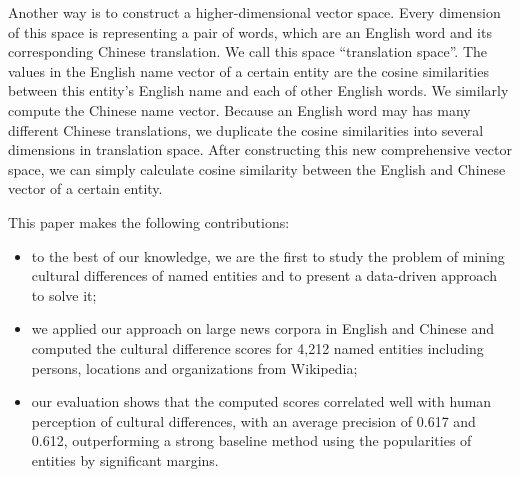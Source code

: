 Another way is to construct a higher-dimensional vector space.
Every dimension of this space is representing a pair of words,
which are an English word and its corresponding Chinese translation.
We call this space ``translation space''.
The values in the English name vector of a certain entity are
the cosine similarities between
this entity's English name and each of other English words.
We similarly compute the Chinese name vector.
Because an English word may has many different Chinese translations, we duplicate the cosine similarities into several dimensions in translation space. After constructing this new comprehensive vector space, we can simply calculate cosine similarity between the English and Chinese vector of a certain entity.


This paper makes the following contributions:
\begin{itemize}
\item to the best of our knowledge, we are the first to study the problem
of mining cultural differences of named entities and to present a data-driven
approach to solve it;
\item we applied our approach on large news corpora in English and Chinese and
computed the cultural difference scores for 4,212 named entities including
persons, locations and organizations from Wikipedia;
\item our evaluation shows that the computed scores
correlated well with human perception of cultural differences, with an
average precision of 0.617 and 0.612,
outperforming a strong baseline method using the popularities of entities by significant margins.
\end{itemize}
